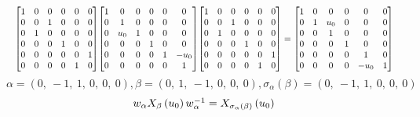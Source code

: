 \documentclass[11pt]{article}
\theoremstyle{definition}
\begin{document}
\[
\scaletoalign{\textwidth}{{\left[\begin{matrix}1 & 0 & 0 & 0 & 0 & 0\\0 & 0 & 1 & 0 & 0 & 0\\0 & 1 & 0 & 0 & 0 & 0\\0 & 0 & 0 & 1 & 0 & 0\\0 & 0 & 0 & 0 & 0 & 1\\0 & 0 & 0 & 0 & 1 & 0\end{matrix}\right]} {\left[\begin{matrix}1 & 0 & 0 & 0 & 0 & 0\\0 & 1 & 0 & 0 & 0 & 0\\0 & u_{0} & 1 & 0 & 0 & 0\\0 & 0 & 0 & 1 & 0 & 0\\0 & 0 & 0 & 0 & 1 & - u_{0}\\0 & 0 & 0 & 0 & 0 & 1\end{matrix}\right]} {\left[\begin{matrix}1 & 0 & 0 & 0 & 0 & 0\\0 & 0 & 1 & 0 & 0 & 0\\0 & 1 & 0 & 0 & 0 & 0\\0 & 0 & 0 & 1 & 0 & 0\\0 & 0 & 0 & 0 & 0 & 1\\0 & 0 & 0 & 0 & 1 & 0\end{matrix}\right]} = {\left[\begin{matrix}1 & 0 & 0 & 0 & 0 & 0\\0 & 1 & u_{0} & 0 & 0 & 0\\0 & 0 & 1 & 0 & 0 & 0\\0 & 0 & 0 & 1 & 0 & 0\\0 & 0 & 0 & 0 & 1 & 0\\0 & 0 & 0 & 0 & - u_{0} & 1\end{matrix}\right]}}
\]
\[
\alpha = \left( 0, \  -1, \  1, \  0, \  0, \  0\right), \beta = \left( 0, \  1, \  -1, \  0, \  0, \  0\right), \sigma_{\alpha}(\beta) = \left( 0, \  -1, \  1, \  0, \  0, \  0\right)
\]
\[
\scaletoalign{\textwidth}{w_{\alpha} X_{\beta}\left(u_{0}\right) w_{\alpha}^{-1} = X_{\sigma_{\alpha}\left(\beta\right)}\left(u_{0}\right)}
\]
\end{document}
